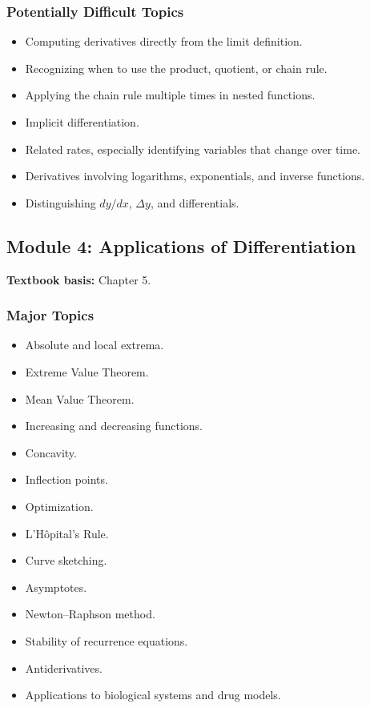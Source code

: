 \documentclass[11pt]{article}
\begin{document}
\subsubsection*{Potentially Difficult Topics}

\begin{itemize}
    \item Computing derivatives directly from the limit definition.
    \item Recognizing when to use the product, quotient, or chain rule.
    \item Applying the chain rule multiple times in nested functions.
    \item Implicit differentiation.
    \item Related rates, especially identifying variables that change over time.
    \item Derivatives involving logarithms, exponentials, and inverse functions.
    \item Distinguishing \(dy/dx\), \(\Delta y\), and differentials.
\end{itemize}

\subsection{Module 4: Applications of Differentiation}

\textbf{Textbook basis:} Chapter 5.

\subsubsection*{Major Topics}

\begin{itemize}
    \item Absolute and local extrema.
    \item Extreme Value Theorem.
    \item Mean Value Theorem.
    \item Increasing and decreasing functions.
    \item Concavity.
    \item Inflection points.
    \item Optimization.
    \item L'H\^{o}pital's Rule.
    \item Curve sketching.
    \item Asymptotes.
    \item Newton--Raphson method.
    \item Stability of recurrence equations.
    \item Antiderivatives.
    \item Applications to biological systems and drug models.
\end{itemize}
\end{document}
